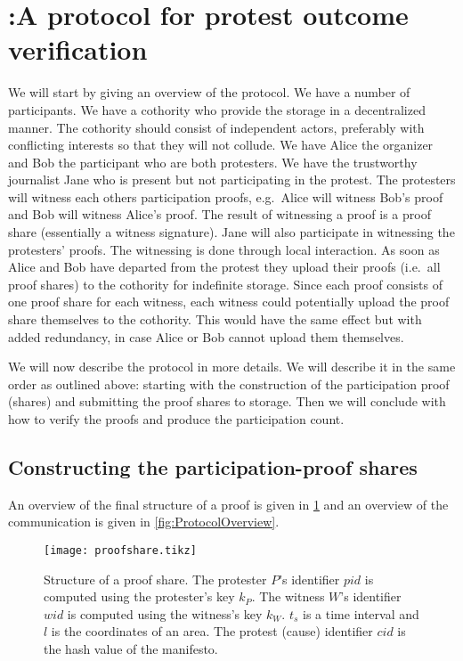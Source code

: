 \section{\PRIVO:\@ A protocol for protest outcome verification}%
\label{protocol}

We will start by giving an overview of the protocol.
We have a number of participants.
We have a cothority who provide the storage in a decentralized manner.
The cothority should consist of independent actors, preferably with conflicting 
interests so that they will not collude.
We have Alice the organizer and Bob the participant who are both protesters.
We have the trustworthy journalist Jane who is present but not participating in 
the protest.
The protesters will witness each others participation proofs, e.g.\ Alice will 
witness Bob's proof and Bob will witness Alice's proof.
The result of witnessing a proof is a proof share (essentially a witness 
signature).
Jane will also participate in witnessing the protesters' proofs.
The witnessing is done through local interaction.
As soon as Alice and Bob have departed from the protest they upload their proofs 
(i.e.\ all proof shares) to the cothority for indefinite storage.
Since each proof consists of one proof share for each witness, each witness 
could potentially upload the proof share themselves to the cothority.
This would have the same effect but with added redundancy, in case Alice or Bob 
cannot upload them themselves.

We will now describe the protocol in more details.
We will describe it in the same order as outlined above:
starting with the construction of the participation proof (shares) and 
submitting the proof shares to storage.
Then we will conclude with how to verify the proofs and produce the 
participation count.

\subsection{Constructing the participation-proof shares}

An overview of the final structure of a proof is given in \cref{fig:ProofFig} 
and an overview of the communication is given in \cref{fig:ProtocolOverview}.

\begin{figure}
  \centering
  \texttt{[image: proofshare.tikz]}
  \caption{%
    Structure of a proof share.
    The protester \(P\)'s identifier \(pid\) is computed using the protester's 
    key \(k_P\).
    The witness \(W\)'s identifier \(wid\) is computed using the witness's key 
    \(k_W\).
    \(t_s\) is a time interval and \(l\) is the coordinates of an area.
    The protest (cause) identifier \(cid\) is the hash value of the manifesto.
  }%
  \label{fig:ProofFig}
\end{figure}%

